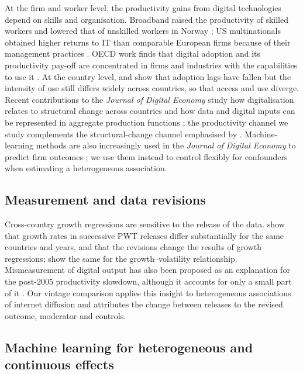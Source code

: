 \documentclass[pdflatex,sn-basic]{sn-jnl}%
\theoremstyle{thmstyleone}
\theoremstyle{thmstyletwo}
\begin{document}
At the firm and worker level, the productivity gains from digital technologies depend on skills and organisation. Broadband raised the productivity of skilled workers and lowered that of unskilled workers in Norway \citep{akerman2015broadband}; US multinationals obtained higher returns to IT than comparable European firms because of their management practices \citep{bloom2012americans}. OECD work finds that digital adoption and its productivity pay-off are concentrated in firms and industries with the capabilities to use it \citep{gal2019digitalisation,nicoletti2020diffusion}. At the country level, \citet{comin2010diffusion} and \citet{comin2018diffusion} show that adoption lags have fallen but the intensity of use still differs widely across countries, so that access and use diverge. Recent contributions to the \textit{Journal of Digital Economy} study how digitalisation relates to structural change across countries \citep{banga2026digitalisation} and how data and digital inputs can be represented in aggregate production functions \citep{chen2026production}; the productivity channel we study complements the structural-change channel emphasised by \citet{banga2026digitalisation}. Machine-learning methods are also increasingly used in the \textit{Journal of Digital Economy} to predict firm outcomes \citep{xu2026carbon}; we use them instead to control flexibly for confounders when estimating a heterogeneous association.

\subsection{Measurement and data revisions}

Cross-country growth regressions are sensitive to the release of the data. \citet{johnson2013newer} show that growth rates in successive PWT releases differ substantially for the same countries and years, and that the revisions change the results of growth regressions; \citet{ponomareva2010pwt} show the same for the growth--volatility relationship. Mismeasurement of digital output has also been proposed as an explanation for the post-2005 productivity slowdown, although it accounts for only a small part of it \citep{byrne2016mismeasurement,syverson2017mismeasurement}. Our vintage comparison applies this insight to heterogeneous associations of internet diffusion and attributes the change between releases to the revised outcome, moderator and controls.

\subsection{Machine learning for heterogeneous and continuous effects}
\end{document}
